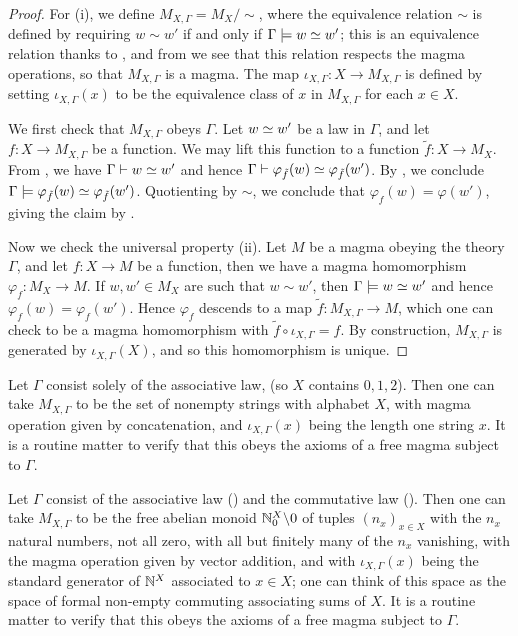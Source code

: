 \begin{proof}
  For (i), we define $M_{X,\Gamma} = M_X / \sim$, where the equivalence relation $\sim$ is defined by requiring $w \sim w'$ if and only if $\Gamma \models w \simeq w'$; this is an equivalence relation thanks to , and from  we see that this relation respects the magma operations, so that $M_{X,\Gamma}$ is a magma. The map $\iota_{X,\Gamma}: X \to M_{X,\Gamma}$ is defined by setting $\iota_{X,\Gamma}(x)$ to be the equivalence class of $x$ in $M_{X,\Gamma}$ for each $x \in X$.

  We first check that $M_{X,\Gamma}$ obeys $\Gamma$. Let $w \simeq w'$ be a law in $\Gamma$, and let $f: X \to M_{X,\Gamma}$ be a function. We may lift this function to a function $\tilde{f}: X \to M_X$. From , we have $\Gamma \vdash w \simeq w'$ and hence $\Gamma \vdash \varphi_{\tilde{f}}(w) \simeq \varphi_{\tilde{f}}(w')$. By , we conclude $\Gamma \models \varphi_{\tilde{f}}(w) \simeq \varphi_{\tilde{f}}(w')$. Quotienting by $\sim$, we conclude that $\varphi_f(w) = \varphi(w')$, giving the claim by .

  Now we check the universal property (ii). Let $M$ be a magma obeying the theory $\Gamma$, and let $f: X \to M$ be a function, then we have a magma homomorphism $\varphi_f: M_X \to M$. If $w, w' \in M_X$ are such that $w \sim w'$, then $\Gamma \models w \simeq w'$ and hence $\varphi_f(w) = \varphi_f(w')$. Hence $\varphi_f$ descends to a map $\tilde{f}: M_{X,\Gamma} \to M$, which one can check to be a magma homomorphism with $\tilde{f} \circ \iota_{X,\Gamma} = f$. By construction, $M_{X,\Gamma}$ is generated by $\iota_{X,\Gamma}(X)$, and so this homomorphism is unique.
\end{proof}

\begin{example}
  Let $\Gamma$ consist solely of the associative law,  (so $X$ contains $0,1,2$). Then one can take $M_{X,\Gamma}$ to be the set of nonempty strings with alphabet $X$, with magma operation given by concatenation, and $\iota_{X,\Gamma}(x)$ being the length one string $x$. It is a routine matter to verify that this obeys the axioms of a free magma subject to $\Gamma$.
\end{example}

\begin{example}\label{facm}
  Let $\Gamma$ consist of the associative law () and the commutative law (). Then one can take $M_{X,\Gamma}$ to be the free abelian monoid $\mathbb{N}_0^X \backslash 0$ of tuples $(n_x)_{x \in X}$ with the $n_x$ natural numbers, not all zero, with all but finitely many of the $n_x$ vanishing, with the magma operation given by vector addition, and with $\iota_{X,\Gamma}(x)$ being the standard generator of $\mathbb{N}^X$ associated to $x \in X$; one can think of this space as the space of formal non-empty commuting associating sums of $X$. It is a routine matter to verify that this obeys the axioms of a free magma subject to $\Gamma$.
\end{example}

